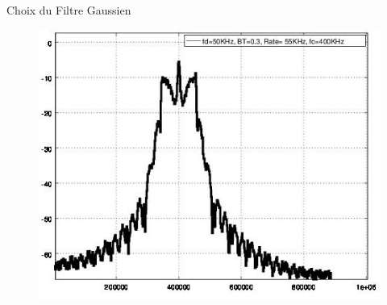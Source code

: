 \documentclass[8pt]{beamer}
\newcommand{\1}{\mathbbm 1}
\begin{document}
\begin{frame}{Choix du Filtre Gaussien}
{\begin{figure}
\centering
\includegraphics[scale=0.22]{figures/fig3.jpg} 
\end{figure}}

\end{frame}
\end{document}

